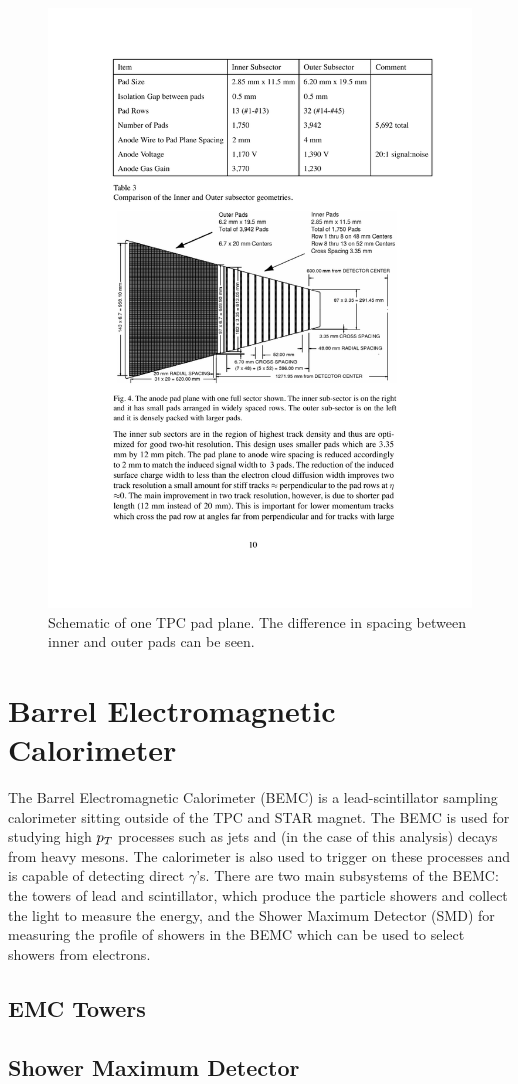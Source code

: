 \begin{figure}[htbp]
\begin{center}
\includegraphics[scale=1.0]{Plots/Detector/TPC_pad.pdf}
\end{center}
\caption[TPC Sector]{Schematic of one TPC pad plane. The difference in spacing between inner and outer pads can be seen.}
\label{fig:TPC_pad}
\end{figure}

\section{Barrel Electromagnetic Calorimeter}

The Barrel Electromagnetic Calorimeter (BEMC) is a lead-scintillator sampling calorimeter sitting outside of the TPC and STAR magnet. The BEMC is used for studying high $p_{T}$ processes such as jets and (in the case of this analysis) decays from heavy mesons. The calorimeter is also used to trigger on these processes and is capable of detecting direct $\gamma$'s. There are two main subsystems of the BEMC: the towers of lead and scintillator, which produce the particle showers and collect the light to measure the energy, and the Shower Maximum Detector (SMD) for measuring the profile of showers in the BEMC which can be used to select showers from electrons.

\subsection{EMC Towers}

\subsection{Shower Maximum Detector}
